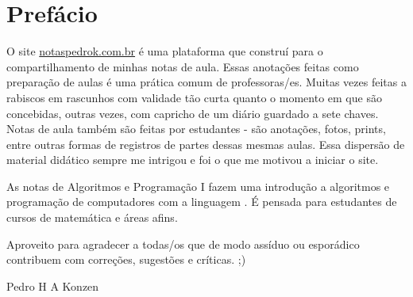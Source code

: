 
\chapter*{Prefácio}\label{prefacio}

O site \href{https://www.notaspedrok.com.br}{notaspedrok.com.br} é uma plataforma que construí para o compartilhamento de minhas notas de aula. Essas anotações feitas como preparação de aulas é uma prática comum de professoras/es. Muitas vezes feitas a rabiscos em rascunhos com validade tão curta quanto o momento em que são concebidas, outras vezes, com capricho de um diário guardado a sete chaves. Notas de aula também são feitas por estudantes - são anotações, fotos, prints, entre outras formas de registros de partes dessas mesmas aulas. Essa dispersão de material didático sempre me intrigou e foi o que me motivou a iniciar o site.

As notas de Algoritmos e Programação I fazem uma introdução a algoritmos e programação de computadores com a linguagem {\python}. É pensada para estudantes de cursos de matemática e áreas afins.

Aproveito para agradecer a todas/os que de modo assíduo ou esporádico contribuem com correções, sugestões e críticas. ;)

\begin{flushright}
  Pedro H A Konzen
\end{flushright}

